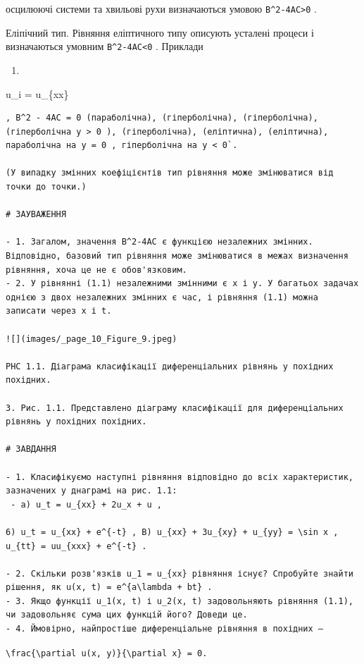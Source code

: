 \documentclass[
  ukrainian,
]{article}
\providecommand{\tightlist}{%
  \setlength{\itemsep}{0pt}\setlength{\parskip}{0pt}}
\begin{document}
осцилюючі системи та хвильові рухи визначаються умовою
\texttt{B\^{}2-4AC\textgreater{}0} .

Еліпічний тип. Рівняння еліптичного типу описують усталені процеси і
визначаються умовним \texttt{B\^{}2-4AC\textless{}0} . Приклади

\begin{enumerate}
\def\labelenumi{\alph{enumi})}
\tightlist
\item
\end{enumerate}

u\_i = u\_\{xx\}

\begin{verbatim}
, B^2 - 4AC = 0 (параболічна), (гіперболічна), (гіперболічна), (гіперболічна y > 0 ), (гіперболічна), (еліптична), (еліптична), параболічна на y = 0 , гіперболічна на y < 0`.

(У випадку змінних коефіцієнтів тип рівняння може змінюватися від точки до точки.)

# ЗАУВАЖЕННЯ

- 1. Загалом, значення B^2-4AC є функцією незалежних змінних. Відповідно, базовий тип рівняння може змінюватися в межах визначення рівняння, хоча це не є обов'язковим.
- 2. У рівнянні (1.1) незалежними змінними є x і y. У багатьох задачах однією з двох незалежних змінних є час, і рівняння (1.1) можна записати через x і t.

![](images/_page_10_Figure_9.jpeg)

PHC 1.1. Діаграма класифікації диференціальних рівнянь у похідних похідних.

3. Рис. 1.1. Представлено діаграму класифікації для диференціальних рівнянь у похідних похідних.

# ЗАВДАННЯ

- 1. Класифікуємо наступні рівняння відповідно до всіх характеристик, зазначених у днаграмі на рис. 1.1:
 - a) u_t = u_{xx} + 2u_x + u ,

6) u_t = u_{xx} + e^{-t} , B) u_{xx} + 3u_{xy} + u_{yy} = \sin x , u_{tt} = uu_{xxx} + e^{-t} .

- 2. Скільки розв'язків u_1 = u_{xx} рівняння існує? Спробуйте знайти рішення, як u(x, t) = e^{a\lambda + bt} .
- 3. Якщо функції u_1(x, t) і u_2(x, t) задовольняють рівняння (1.1), чи задовольняє сума цих функцій його? Доведи це.
- 4. Ймовірно, найпростіше диференціальне рівняння в похідних —
\end{verbatim}

\texttt{\textbackslash{}frac\{\textbackslash{}partial\ u(x,\ y)\}\{\textbackslash{}partial\ x\}\ =\ 0.}
\end{document}
